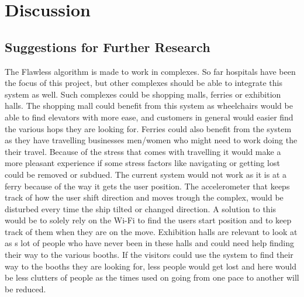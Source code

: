 \chapter{Discussion}


\section{Suggestions for Further Research}
The Flawless algorithm is made to work in complexes. So far hospitals have been the focus of this project, but other complexes should be able to integrate this system as well. Such complexes could be shopping malls, ferries or exhibition halls. The shopping mall could benefit from this system as wheelchairs would be able to find elevators with more ease, and customers in general would easier find the various hops they are looking for. Ferries could also benefit from the system as they have travelling businesses men/women who might need to work doing the their travel. Because of the stress that comes with travelling\cite{future_stress} it would make a more pleasant experience if some stress factors like navigating or getting lost could be removed or subdued. The current system would not work as it is at a ferry because of the way it gets the user position. The accelerometer that keeps track of how the user shift direction and moves trough the complex, would be disturbed every time the ship tilted or changed direction. A solution to this would be to solely rely on the Wi-Fi to find the users start position and to keep track of them when they are on the move. Exhibition halls are relevant to look at as s lot of people who have never been in these halls and could need help finding their way to the various booths. If the visitors could use the system to find their way to the booths they are looking for, less people would get lost and here would be less clutters of people as the times used on going from one pace to another will be reduced.